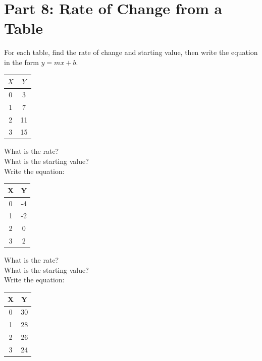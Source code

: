 \documentclass[10pt]{article}
\theoremstyle{definition}
\theoremstyle{plain}
\numberwithin{equation}{section}
\begin{document}
\newpage

\section*{Part 8: Rate of Change from a Table}
\begin{multicolblock}{For each table, find the rate of change and starting value, then write the equation in the form $y=mx+b$.}
  
\begin{center}
  
\begin{tabular}{|c|c|}
\hline $X$ & $Y$ \\
\hline 0 & 3 \\
\hline 1 & 7 \\
\hline 2 & 11 \\
\hline 3 & 15 \\
\hline
\end{tabular}

\end{center}

What is the rate? \underline{\hspace{2cm}} \\
What is the starting value? \underline{\hspace{2cm}} \\
Write the equation: \underline{\hspace{4cm}}


\begin{center}
  

\begin{tabular}{|c|c|}
\hline X & Y \\
\hline 0 & -4 \\
\hline 1 & -2 \\
\hline 2 & 0 \\
\hline 3 & 2 \\
\hline
\end{tabular}
\end{center}

What is the rate? \underline{\hspace{2cm}} \\
What is the starting value? \underline{\hspace{2cm}} \\
Write the equation: \underline{\hspace{4cm}}

\begin{center}
  
\begin{tabular}{|c|c|}
\hline X & Y \\
\hline 0 & 30 \\
\hline 1 & 28 \\
\hline 2 & 26 \\
\hline 3 & 24 \\
\hline
\end{tabular}
\end{center}


\end{multicolblock}
\end{document}
